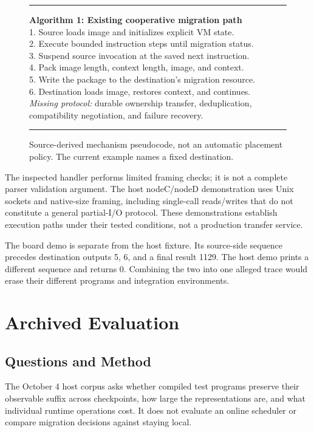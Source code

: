 \documentclass[conference,letterpaper]{IEEEtran}
\begin{document}
\begin{figure}[t]
\small\hrule\vspace{4pt}
\textbf{Algorithm 1: Existing cooperative migration path}\\
1. Source loads image and initializes explicit VM state.\\
2. Execute bounded instruction steps until migration status.\\
3. Suspend source invocation at the saved next instruction.\\
4. Pack image length, context length, image, and context.\\
5. Write the package to the destination's migration resource.\\
6. Destination loads image, restores context, and continues.\\
\emph{Missing protocol:} durable ownership transfer, deduplication,\\
compatibility negotiation, and failure recovery.\vspace{4pt}\hrule
\caption{Source-derived mechanism pseudocode, not an automatic placement policy. The current example names a fixed destination.}
\end{figure}

The inspected handler performs limited framing checks; it is not a complete parser validation argument. The host nodeC/nodeD demonstration uses Unix sockets and native-size framing, including single-call reads/writes that do not constitute a general partial-I/O protocol. These demonstrations establish execution paths under their tested conditions, not a production transfer service.

The board demo is separate from the host fixture. Its source-side sequence precedes destination outputs 5, 6, and a final result 1129. The host demo prints a different sequence and returns 0. Combining the two into one alleged trace would erase their different programs and integration environments.

\section{Archived Evaluation}
\subsection{Questions and Method}
The October 4 host corpus asks whether compiled test programs preserve their observable suffix across checkpoints, how large the representations are, and what individual runtime operations cost. It does not evaluate an online scheduler or compare migration decisions against staying local.
\end{document}
